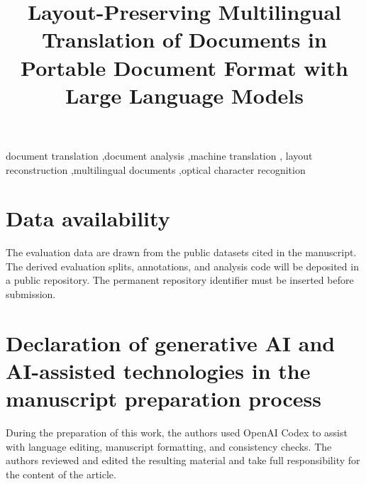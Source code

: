 \documentclass[preprint,12pt,authoryear]{elsarticle}
\begin{document}
\begin{frontmatter}

\title{Layout-Preserving Multilingual Translation of Documents in Portable
Document Format with Large Language Models}




\begin{keyword}
document translation \sep document analysis \sep machine translation \sep
layout reconstruction \sep multilingual documents \sep optical character recognition
\end{keyword}

\end{frontmatter}








\section*{Data availability}
The evaluation data are drawn from the public datasets cited in the manuscript.
The derived evaluation splits, annotations, and analysis code will be deposited
in a public repository. The permanent repository identifier must be inserted
before submission.

\section*{Declaration of generative AI and AI-assisted technologies in the
manuscript preparation process}
During the preparation of this work, the authors used OpenAI Codex to assist
with language editing, manuscript formatting, and consistency checks. The
authors reviewed and edited the resulting material and take full responsibility
for the content of the article.


\nocite{fasttext,comet22,exponential-backoff,aws-backoff-jitter,
api-rate-limit-design}

\end{document}
